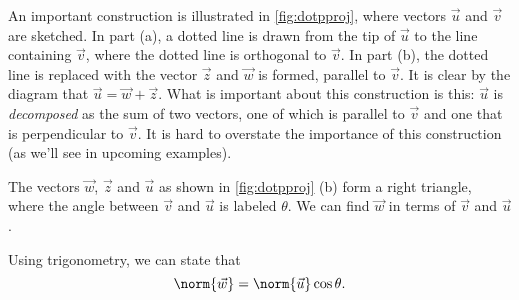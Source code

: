 
An important construction is illustrated in \autoref{fig:dotpproj}, where vectors $\vec u$ and $\vec v$ are sketched. In part (a), a dotted line is drawn from the tip of $\vec u$ to the line containing $\vec v$, where the dotted line is orthogonal to $\vec v$. In part (b), the dotted line is replaced with the vector $\vec z$ and  $\vec w$ is formed, parallel to $\vec v$. It is clear by the diagram that $\vec u = \vec w+\vec z$. What is important about this construction is this: $\vec u$ is \emph{decomposed} as the sum of two vectors, one of which is parallel to $\vec v$ and one that is perpendicular to $\vec v$. It is hard to overstate the importance of this construction (as we'll see in upcoming examples). 

The vectors $\vec w$, $\vec z$ and $\vec u$ as shown in \autoref{fig:dotpproj} (b) form a right triangle, where the angle between $\vec v$ and $\vec u$ is labeled $\theta$. We can find $\vec w$ in terms of $\vec v$ and $\vec u$.

Using trigonometry, we can state that 
\begin{equation}
\norm{\vec w} = \norm{\vec u}\cos \theta. \label{eq:proj1}%
\end{equation}

